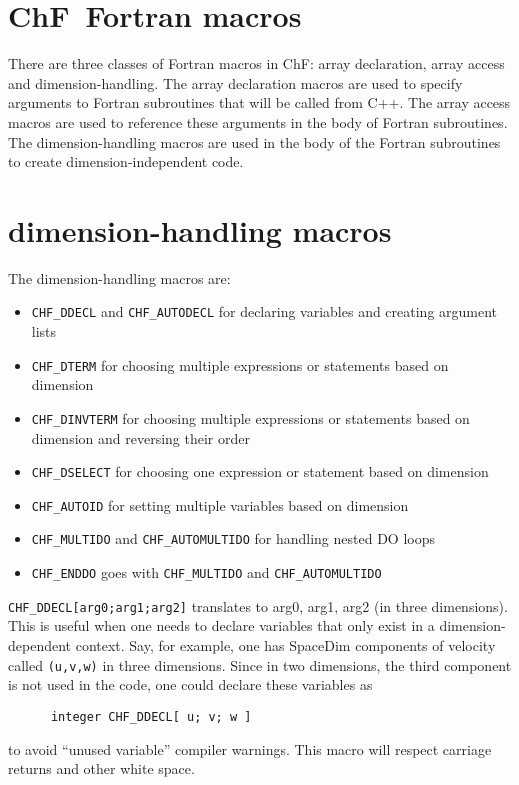 \section{ChF\ Fortran macros}

There are three classes of Fortran macros in ChF: array declaration, array
access and dimension-handling.  The array declaration macros are used to
specify arguments to Fortran subroutines that will be called from C++.  The
array access macros are used to reference these arguments in the body of
Fortran subroutines.  The dimension-handling macros are used in the body of the 
Fortran subroutines to create dimension-independent code.

\section{dimension-handling macros}

\noindent The dimension-handling macros are:
\begin{itemize}
\item{\tt CHF\_DDECL} and {\tt CHF\_AUTODECL} for declaring variables
  and creating argument lists 
\item{\tt CHF\_DTERM} for choosing multiple expressions or statements based on dimension
\item{\tt CHF\_DINVTERM} for choosing multiple expressions or statements based on dimension and reversing their order
\item{\tt CHF\_DSELECT} for choosing one expression or statement based on dimension
\item{\tt CHF\_AUTOID} for setting multiple variables based on dimension
\item{\tt CHF\_MULTIDO} and {\tt CHF\_AUTOMULTIDO} for handling nested DO loops
\item{\tt CHF\_ENDDO} goes with {\tt CHF\_MULTIDO} and {\tt CHF\_AUTOMULTIDO}
\end{itemize}

{\tt CHF\_DDECL[arg0;arg1;arg2]} translates to {arg0, arg1, arg2} (in three
dimensions).  This is useful when one needs to declare variables that only
exist in a dimension-dependent context. Say, for example, one has SpaceDim
components of velocity called {\tt (u,v,w)} in three dimensions.  Since in
two dimensions, the third component is not used in the code, one could
declare these variables as
\begin{verbatim}
      integer CHF_DDECL[ u; v; w ]
\end{verbatim}
to avoid ``unused variable'' compiler warnings.  This macro will
respect carriage returns and other white space.

